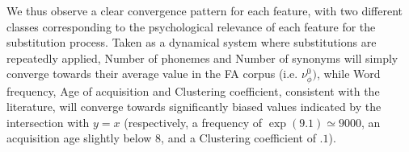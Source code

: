 



\medskip
We thus observe a clear convergence pattern for each feature, with two different classes corresponding to the psychological relevance of each feature for the substitution process.
Taken as a dynamical system where substitutions are repeatedly applied, Number of phonemes and Number of synonyms will simply converge towards their average value in the FA corpus (i.e. $\nu_{\phi}^0)$, while Word frequency, Age of acquisition and Clustering coefficient, consistent with the literature, will converge towards significantly biased values indicated by the intersection with $y = x$ (respectively, a frequency of $\exp(9.1) \simeq 9000$, an acquisition age slightly below 8, and a Clustering coefficient of $.1$).

